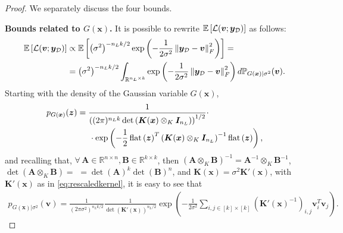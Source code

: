 \documentclass[a4paper, 11pt, reqno]{amsart}
\theoremstyle{plain}
\theoremstyle{remark}
\theoremstyle{definition}
\newcommand{\mean}[2][\kern-0.5pt]{\mathbb{E}_{#1}\left[#2\right]}
\newcommand{\real}{\mathbb{R}}
\newcommand{\norm}[1]{\left\lVert#1\right\rVert}
\renewcommand{\exp}[1]{\operatorname{exp}\left(#1\right)}
\renewcommand{\det}[1]{\operatorname{det}\left(#1\right)}
\newcommand{\flatten}[1]{\operatorname{flat}\left(#1\right)}
\let\oldforall\forall
\renewcommand{\forall}{\oldforall\,}
\newcommand{\blankeq}{\kern14.65pt}
\begin{document}
\begin{proof}
	We separately discuss the four bounds.
	
	\textbf{Bounds related to $G(\bm{x})$.}	It is possible to rewrite $\mean{\mathcal{L}(\bm{v}; \bm{y}_{\mathcal{D}})}$ as follows:
	\begin{align} \label{eq:nngpexplikelihood}
		\mean{\mathcal{L}(\bm{v}; \bm{y}_{\mathcal{D}})} & \propto \mean{\left(\sigma^2\right)^{- n_L k / 2} \exp{-\frac{1}{2\sigma^2} \norm{\bm{y}_{\mathcal{D}} - \bm{v}}_F^2}} = \nonumber \\
		& = \left(\sigma^2\right)^{- n_L k / 2} \int_{\real^{n_L \times k}} \exp{-\frac{1}{2\sigma^2} \norm{\bm{y}_{\mathcal{D}} - \bm{v}}_F^2} d \mathbb{P}_{G(\bm{x}) | \sigma^2}(\bm{v}).
	\end{align}
	Starting with the density of the Gaussian variable $G(\bm{x})$,
	\begin{equation*}
		\begin{aligned}	
			p_{G(\bm{x})}(\bm{z}) & = \frac{1}{\left((2\pi)^{n_L k} \det{\bm{K}(\bm{x}) \otimes_K \bm{I}_{n_L}}\right)^{1/2}} \cdot \\
			& \blankeq \cdot \exp{-\frac{1}{2} \flatten{\bm{z}}^T \left(\bm{K}(\bm{x}) \otimes_K \bm{I}_{n_L} \right)^{-1} \flatten{\bm{z}}},
		\end{aligned}
	\end{equation*}
	and recalling that, $\forall \bm{A} \in \real^{n \times n}, \bm{B} \in \real^{k \times k}$, then $(\bm{A} \otimes_K \bm{B})^{-1} = \bm{A}^{-1} \otimes_K \bm{B}^{-1}$, $\det{\bm{A} \otimes_K \bm{B}} =$ $= \det{\bm{A}}^k \det{\bm{B}}^n$, and $\bm{K}(\bm{x}) = \sigma^2 \bm{K}'(\bm{x})$, with $\bm{K}'(\bm{x})$ as in \cref{eq:rescaledkernel}, it is easy to see that 
	\begin{equation} \label{eq:densitynngp}
		\begin{aligned}	
			p_{G(\bm{x}) | \sigma^2}(\bm{v}) = \frac{1}{(2 \pi \sigma^2)^{n_L k / 2}} \frac{1}{\det{\bm{K}'(\bm{x})}^{n_L / 2}} \exp{-\frac{1}{2 \sigma^2} \sum_{i, j \in [k] \times [k]} \left(\bm{K}'(\bm{x})^{-1}\right)_{i, j} \bm{v}_i^T \bm{v}_j}.
		\end{aligned}
	\end{equation}


\end{proof}
\end{document}
